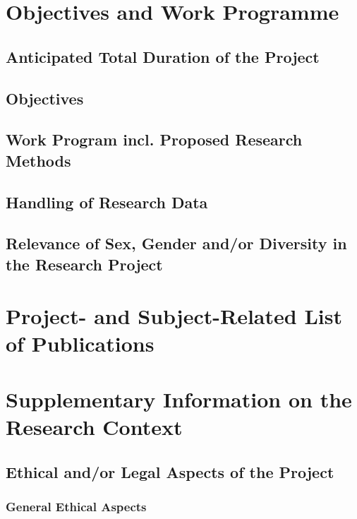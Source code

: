 \documentclass[de]{dfg-proposal}
\begin{document}
\section{Objectives and Work Programme}\label{sec:objectives-and-work-programme}

\subsection{Anticipated Total Duration of the Project}

\subsection{Objectives}

\subsection{Work Program incl. Proposed Research Methods}

\subsection{Handling of Research Data}

\subsection{Relevance of Sex, Gender and/or Diversity in the Research Project}

\section{Project- and Subject-Related List of Publications}\label{sec:bibliography}

\printbibliography

\partbreak

\section{Supplementary Information on the Research Context}\label{sec:begleitinformationen-zum-forschungskontext}

\subsection{Ethical and/or Legal Aspects of the Project}

\subsubsection{General Ethical Aspects}
\end{document}
